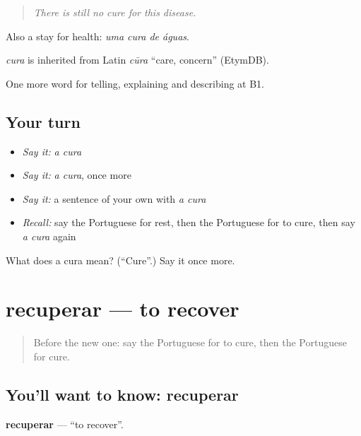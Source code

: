 \begin{quote}
\emph{There is still no cure for this disease.}
\end{quote}

Also a stay for health: \emph{uma cura de águas}.

\begin{cousinweb}
\emph{cura} is inherited from Latin \emph{cūra} \textquotedblleft{}care, concern\textquotedblright{} (EtymDB).
\end{cousinweb}

\begin{grammarlens}[title={What you've built}]
One more word for telling, explaining and describing at B1.
\end{grammarlens}

\subsection*{Your turn}
\begin{itemize}
\raggedright
  \item \emph{Say it:} \emph{a cura}
  \item \emph{Say it:} \emph{a cura}, once more
  \item \emph{Say it:} a sentence of your own with \emph{a cura}
  \item \emph{Recall:} say the Portuguese for rest, then the Portuguese for to cure, then say \emph{a cura} again
\end{itemize}

\begin{tcolorbox}[breakable,colback=teal!4,colframe=teal!35!black,title={Before you move on}]
What does a cura mean? (\textquotedblleft{}Cure\textquotedblright{}.) Say it once more.
\end{tcolorbox}
\section[recuperar]{recuperar — to recover}

\label{lesson:PT-C488-recuperar}



\begin{quote}
Before the new one: say the Portuguese for to cure, then the Portuguese for cure.
\end{quote}

\subsection*{You'll want to know: recuperar}
\textbf{recuperar} — \textquotedblleft{}to recover\textquotedblright{}.

